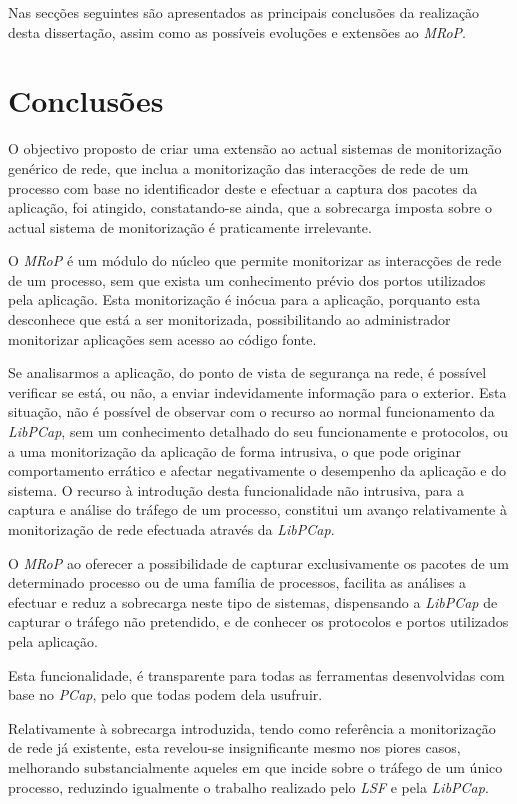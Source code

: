 Nas secções seguintes são apresentados as principais conclusões da realização desta dissertação, assim como as possíveis evoluções e extensões ao \textit{MRoP}.

\section{Conclusões}
\label{sec:conclusoes}

O objectivo proposto de criar uma extensão ao actual sistemas de monitorização genérico de rede, que inclua a monitorização das interacções de rede de um processo com base no identificador deste e efectuar a captura dos pacotes da aplicação, foi atingido, constatando-se ainda, que a sobrecarga imposta sobre o actual sistema de monitorização é praticamente irrelevante.

O \textit{MRoP} é um módulo do núcleo que permite monitorizar as interacções de rede de um processo, sem que exista um conhecimento prévio dos portos utilizados pela aplicação.
Esta monitorização é inócua para a aplicação, porquanto esta desconhece que está a ser monitorizada, possibilitando ao administrador monitorizar aplicações sem acesso ao código fonte.

Se analisarmos a aplicação, do ponto de vista de segurança na rede, é possível verificar se está, ou não, a enviar indevidamente informação para o exterior.
Esta situação, não é possível de observar com o recurso ao normal funcionamento da \textit{LibPCap}, sem um conhecimento detalhado do seu funcionamente e protocolos, ou a uma monitorização da aplicação de forma intrusiva, o que pode originar comportamento errático e afectar negativamente o desempenho da aplicação e do sistema.
O recurso à introdução desta funcionalidade não intrusiva, para a captura e análise do tráfego de um processo, constitui um avanço relativamente à monitorização de rede efectuada através da \textit{LibPCap}.

O \textit{MRoP} ao oferecer a possibilidade de capturar exclusivamente os pacotes de um determinado processo ou de uma família de processos, facilita as análises a efectuar e reduz a sobrecarga neste tipo de sistemas, dispensando a \textit{LibPCap} de capturar o tráfego não pretendido, e de conhecer os protocolos e portos utilizados pela aplicação.

Esta funcionalidade, é transparente para todas as ferramentas desenvolvidas com base no \textit{PCap}, pelo que todas podem dela usufruir.

Relativamente à sobrecarga introduzida, tendo como referência a monitorização de rede já existente, esta revelou-se insignificante mesmo nos piores casos, melhorando substancialmente aqueles em que incide sobre o tráfego de um único processo, reduzindo igualmente o trabalho realizado pelo \textit{LSF} e pela \textit{LibPCap}.

